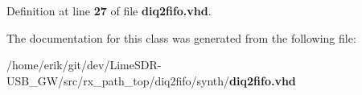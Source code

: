 Definition at line {\bf 27} of file {\bf diq2fifo.\+vhd}.



The documentation for this class was generated from the following file\+:\begin{DoxyCompactItemize}
\item 
/home/erik/git/dev/\+Lime\+S\+D\+R-\/\+U\+S\+B\+\_\+\+G\+W/src/rx\+\_\+path\+\_\+top/diq2fifo/synth/{\bf diq2fifo.\+vhd}\end{DoxyCompactItemize}
